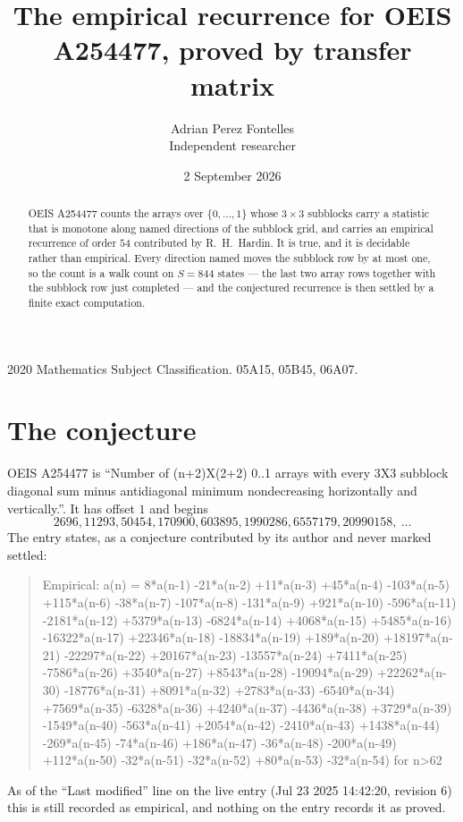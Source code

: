 \documentclass[11pt,a4paper]{article}
\title{The empirical recurrence for OEIS A254477, proved by transfer matrix}
\author{Adrian Perez Fontelles\\ \small Independent researcher}
\date{2 September 2026}
\theoremstyle{plain}
\theoremstyle{definition}
\begin{document}
\maketitle

\begin{abstract}
OEIS A254477 counts the arrays over $\{0,\dots,1\}$ whose $3\times3$ subblocks carry a
statistic that is monotone along named directions of the subblock grid, and carries an
empirical recurrence of order $54$ contributed by R.~H.~Hardin. It is true, and it is
decidable rather than empirical. Every direction named moves the subblock row by at most one,
so the count is a walk count on $S=844$ states --- the last two array rows together with the
subblock row just completed --- and the conjectured recurrence is then settled by a finite
exact computation.
\end{abstract}

\noindent\small 2020 Mathematics Subject Classification. 05A15, 05B45, 06A07.\normalsize

\section{The conjecture}

OEIS A254477 is ``Number of (n+2)X(2+2) 0..1 arrays with every 3X3 subblock diagonal sum minus antidiagonal minimum nondecreasing horizontally and vertically.''. It has offset $1$ and begins
\[
2696, 11293, 50454, 170900, 603895, 1990286, 6557179, 20990158,\ \dots
\]
The entry states, as a conjecture contributed by its author and never marked settled:
\begin{quote}
Empirical: a(n) = 8*a(n-1) -21*a(n-2) +11*a(n-3) +45*a(n-4) -103*a(n-5) +115*a(n-6) -38*a(n-7) -107*a(n-8) -131*a(n-9) +921*a(n-10) -596*a(n-11) -2181*a(n-12) +5379*a(n-13) -6824*a(n-14) +4068*a(n-15) +5485*a(n-16) -16322*a(n-17) +22346*a(n-18) -18834*a(n-19) +189*a(n-20) +18197*a(n-21) -22297*a(n-22) +20167*a(n-23) -13557*a(n-24) +7411*a(n-25) -7586*a(n-26) +3540*a(n-27) +8543*a(n-28) -19094*a(n-29) +22262*a(n-30) -18776*a(n-31) +8091*a(n-32) +2783*a(n-33) -6540*a(n-34) +7569*a(n-35) -6328*a(n-36) +4240*a(n-37) -4436*a(n-38) +3729*a(n-39) -1549*a(n-40) -563*a(n-41) +2054*a(n-42) -2410*a(n-43) +1438*a(n-44) -269*a(n-45) -74*a(n-46) +186*a(n-47) -36*a(n-48) -200*a(n-49) +112*a(n-50) -32*a(n-51) -32*a(n-52) +80*a(n-53) -32*a(n-54) for n>62
\end{quote}
As of the ``Last modified'' line on the live entry (Jul 23 2025 14:42:20, revision 6) this is still
recorded as empirical, and nothing on the entry records it as proved.
\end{document}
